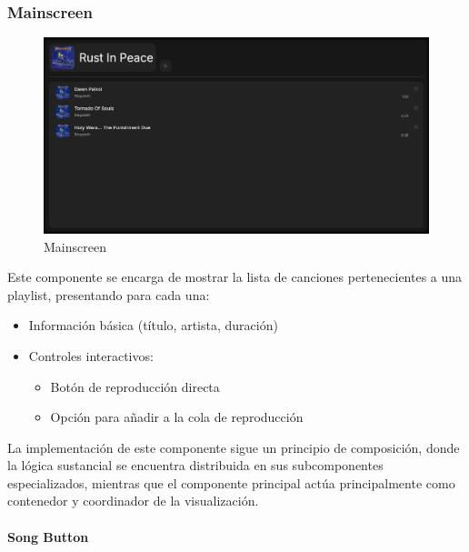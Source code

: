 \documentclass[11pt, a4paper]{article}
\begin{document}
            \subsubsection{Mainscreen}

            \begin{figure}[H]
                \centering
                \includegraphics[width=1\textwidth]{media/screenshots/playlist.png}
                \caption{Mainscreen}
                \label{fig:Mainscreen}
            \end{figure}

            Este componente se encarga de mostrar la lista de canciones pertenecientes a una playlist, presentando para cada una:

            \begin{itemize}
                \item Información básica (título, artista, duración)
                \item Controles interactivos:
                \begin{itemize}
                    \item Botón de reproducción directa
                    \item Opción para añadir a la cola de reproducción
                \end{itemize}
            \end{itemize}

            La implementación de este componente sigue un principio de composición, donde la lógica sustancial se encuentra distribuida en sus subcomponentes especializados, mientras que el componente principal actúa principalmente como contenedor y coordinador de la visualización. \\

                \paragraph{Song Button}
                ‎
\end{document}
